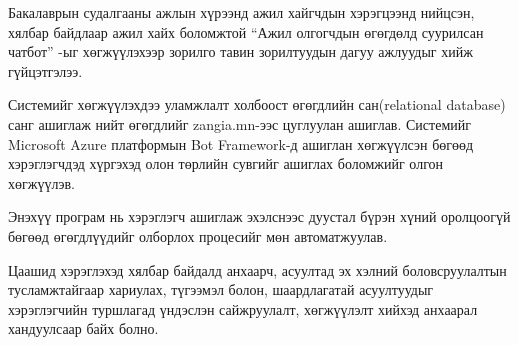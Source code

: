 
\indent Бакалаврын судалгааны ажлын хүрээнд ажил хайгчдын хэрэгцээнд нийцсэн, хялбар байдлаар ажил хайх боломжтой ``Ажил олгогчдын өгөгдөлд суурилсан чатбот'' -ыг хөгжүүлэхээр зорилго тавин зорилтуудын дагуу ажлуудыг хийж гүйцэтгэлээ.

\indent Системийг хөгжүүлэхдээ уламжлалт холбоост өгөгдлийн сан(relational database) санг ашиглаж нийт өгөгдлийг zangia.mn-ээс цуглуулан ашиглав. Системийг Microsoft Azure платформын Bot Framework-д ашиглан хөгжүүлсэн бөгөөд хэрэглэгчдэд хүргэхэд олон төрлийн сувгийг ашиглах боломжийг олгон хөгжүүлэв.

\indent Энэхүү програм нь хэрэглэгч ашиглаж эхэлснээс дуустал бүрэн хүний оролцоогүй бөгөөд өгөгдлүүдийг олборлох процесийг мөн автоматжуулав. 

\indent Цаашид хэрэглэхэд хялбар байдалд анхаарч, асуултад эх хэлний боловсруулалтын тусламжтайгаар хариулах, түгээмэл болон, шаардлагатай асуултуудыг хэрэглэгчийн туршлагад үндэслэн сайжруулалт, хөгжүүлэлт хийхэд анхаарал хандуулсаар байх болно. 